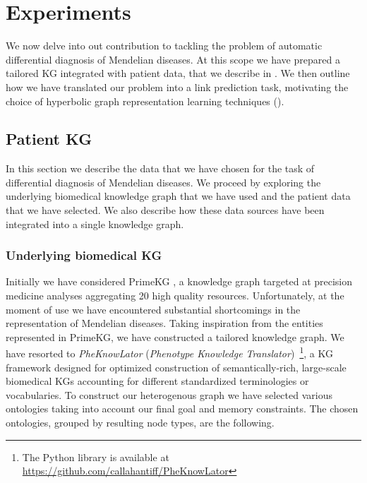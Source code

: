 \chapter{Experiments}
We now delve into out contribution to tackling the problem of automatic differential diagnosis of Mendelian diseases. At this scope we have prepared a tailored KG integrated with patient data, that we describe in . We then outline how we have translated our problem into a link prediction task, motivating the choice of hyperbolic graph representation learning techniques (). 

\section{Patient KG}\label{sec:patientKG}
In this section we describe the data that we have chosen for the task of differential diagnosis of Mendelian diseases. We proceed by exploring the underlying biomedical knowledge graph that we have used and the patient data that we have selected. We also describe how these data sources have been integrated into a single knowledge graph.

\subsection{Underlying biomedical KG}
Initially we have considered PrimeKG \cite{chandak2023PrimeKG}, a knowledge graph targeted at precision medicine analyses aggregating 20 high quality resources. Unfortunately, at the moment of use we have encountered substantial shortcomings in the representation of Mendelian diseases. Taking inspiration from the entities represented in PrimeKG, we have constructed a tailored knowledge graph. We have resorted to \emph{PheKnowLator} (\emph{Phenotype Knowledge Translator})~\cite{callahan2020PheKnowlator}\footnote{The Python library is available at \url{https://github.com/callahantiff/PheKnowLator}}, a KG framework designed for optimized construction of semantically-rich, large-scale biomedical KGs accounting for different standardized terminologies or vocabularies. To construct our heterogenous graph we have selected various ontologies taking into account our final goal and memory constraints. The chosen ontologies, grouped by resulting node types, are the following.


